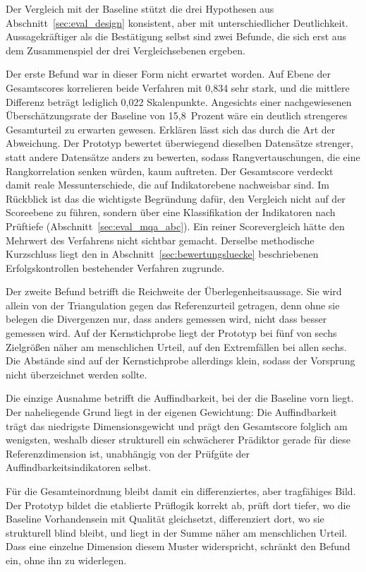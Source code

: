 Der Vergleich mit der Baseline stützt die drei Hypothesen aus
Abschnitt~\ref{sec:eval_design} konsistent, aber mit unterschiedlicher
Deutlichkeit. Aussagekräftiger als die Bestätigung selbst sind zwei Befunde, die
sich erst aus dem Zusammenspiel der drei Vergleichsebenen ergeben.

Der erste Befund war in dieser Form nicht erwartet worden. Auf Ebene der Gesamtscores korrelieren beide
Verfahren mit 0{,}834 sehr stark, und die mittlere Differenz beträgt lediglich
0{,}022 Skalenpunkte. Angesichts einer nachgewiesenen Überschätzungsrate der
Baseline von 15{,}8~Prozent wäre ein deutlich strengeres Gesamturteil zu erwarten
gewesen. Erklären lässt sich das durch die Art der Abweichung. Der Prototyp bewertet
überwiegend dieselben Datensätze strenger, statt andere Datensätze anders zu
bewerten, sodass Rangvertauschungen, die eine Rangkorrelation senken würden, kaum
auftreten. Der Gesamtscore verdeckt damit reale Messunterschiede, die auf
Indikatorebene nachweisbar sind. Im Rückblick ist das die wichtigste Begründung dafür, den
Vergleich nicht auf der Scoreebene zu führen, sondern über eine Klassifikation
der Indikatoren nach Prüftiefe (Abschnitt~\ref{sec:eval_mqa_abc}). Ein reiner Scorevergleich hätte den Mehrwert des Verfahrens nicht sichtbar
gemacht. Derselbe methodische Kurzschluss liegt den in
Abschnitt~\ref{sec:bewertungsluecke} beschriebenen Erfolgskontrollen bestehender
Verfahren zugrunde.

Der zweite Befund betrifft die Reichweite der Überlegenheitsaussage. Sie wird
allein von der Triangulation gegen das Referenzurteil getragen, denn ohne sie
belegen die Divergenzen nur, dass anders gemessen wird, nicht dass besser
gemessen wird. Auf der Kernstichprobe liegt der Prototyp bei fünf von sechs
Zielgrößen näher am menschlichen Urteil, auf den Extremfällen bei allen sechs.
Die Abstände sind auf der Kernstichprobe allerdings klein, sodass der Vorsprung
nicht überzeichnet werden sollte.

Die einzige Ausnahme betrifft die Auffindbarkeit, bei der die Baseline vorn
liegt. Der naheliegende Grund liegt in der eigenen Gewichtung: Die Auffindbarkeit
trägt das niedrigste Dimensionsgewicht und prägt den Gesamtscore folglich am
wenigsten, weshalb dieser strukturell ein schwächerer Prädiktor gerade für diese
Referenzdimension ist, unabhängig von der Prüfgüte der
Auffindbarkeitsindikatoren selbst.

Für die Gesamteinordnung bleibt damit ein differenziertes, aber tragfähiges
Bild. Der Prototyp bildet die etablierte Prüflogik korrekt ab, prüft dort tiefer,
wo die Baseline Vorhandensein mit Qualität gleichsetzt, differenziert dort, wo
sie strukturell blind bleibt, und liegt in der Summe näher am menschlichen
Urteil. Dass eine einzelne Dimension diesem Muster widerspricht, schränkt den Befund ein,
ohne ihn zu widerlegen.

